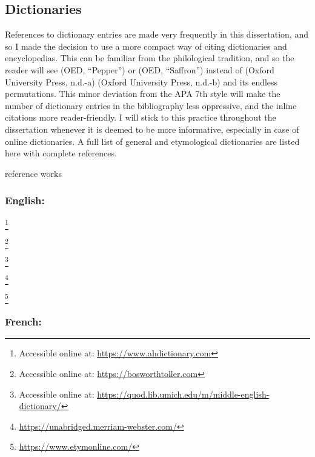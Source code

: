 \subsection{Dictionaries}

References to dictionary entries are made very frequently in this dissertation, and so I made the decision to use a more compact way of citing dictionaries and encyclopedias. This can be familiar from the philological tradition, and so the reader will see (OED, ``Pepper'') or (OED, ``Saffron'') instead of (Oxford University Press, n.d.-a) (Oxford University Press, n.d.-b) and its endless permutations. This minor deviation from the APA 7th style will make the number of dictionary entries in the bibliography less oppressive, and the inline citations more reader-friendly. I will stick to this practice throughout the dissertation whenever it is deemed to be more informative, especially in case of online dictionaries. A full list of general and etymological dictionaries are listed here with complete references.

reference works

\subsubsection{English:}

\textcite{editors_of_the_american_heritage_dictionaries_american_2022} \footnote{Accessible online at: \url{https://www.ahdictionary.com}}

\noindent \textcite{bosworth_anglo-saxon_2014} \footnote{Accessible online at: \url{https://bosworthtoller.com}}

\noindent \textcite{hoad_concise_2003} 

\noindent \textcite{lewis_middle_1952} \footnote{Accessible online at: \url{https://quod.lib.umich.edu/m/middle-english-dictionary/}} 

\noindent \textcite{merriam-webster_merriam_nodate} \footnote{\url{https://unabridged.merriam-webster.com/}}

\noindent \textcite{harper_online_nodate} \footnote{\url{https://www.etymonline.com/}}

\noindent \textcite{oed} 

\noindent \textcite{cresswell_oxford_2021} 

\subsubsection{French:}

